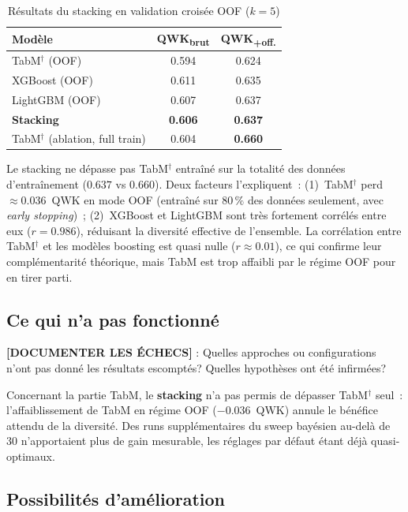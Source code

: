 \documentclass[conference]{IEEEtran}
\begin{document}
\begin{table}[htbp]
\caption{Résultats du stacking en validation croisée OOF ($k=5$)}
\label{tab:stacking}
\centering
\begin{tabular}{lcc}
\toprule
\textbf{Modèle} & \textbf{QWK\textsubscript{brut}} &
\textbf{QWK\textsubscript{+off.}} \\
\midrule
TabM$^\dagger$ (OOF)   & 0.594 & 0.624 \\
XGBoost (OOF)          & 0.611 & 0.635 \\
LightGBM (OOF)         & 0.607 & 0.637 \\
\textbf{Stacking}      & \textbf{0.606} & \textbf{0.637} \\
\midrule
TabM$^\dagger$ (ablation, full train) & 0.604 & \textbf{0.660} \\
\bottomrule
\end{tabular}
\end{table}

Le stacking ne dépasse pas TabM$^\dagger$ entraîné sur la totalité des
données d'entraînement ($0.637$ vs $0.660$). Deux facteurs l'expliquent~:
(1)~TabM$^\dagger$ perd~$\approx 0.036$~QWK en mode OOF (entraîné sur
$80\,\%$ des données seulement, avec \textit{early stopping})~;
(2)~XGBoost et LightGBM sont très fortement corrélés entre eux
($r=0.986$), réduisant la diversité effective de l'ensemble. La corrélation
entre TabM$^\dagger$ et les modèles boosting est quasi nulle ($r\approx0.01$),
ce qui confirme leur complémentarité théorique, mais TabM est trop affaibli
par le régime OOF pour en tirer parti.

\subsection{Ce qui n'a pas fonctionné}

\textbf{[DOCUMENTER LES ÉCHECS]} : Quelles approches ou configurations n'ont pas donné les
résultats escomptés? Quelles hypothèses ont été infirmées?

Concernant la partie TabM, le \textbf{stacking} n'a pas permis de dépasser TabM$^\dagger$
seul~: l'affaiblissement de TabM en régime OOF ($-0.036$~QWK) annule le bénéfice attendu
de la diversité. Des runs supplémentaires du sweep bayésien au-delà de 30 n'apportaient
plus de gain mesurable, les réglages par défaut étant déjà quasi-optimaux.

\subsection{Possibilités d'amélioration}
\end{document}

